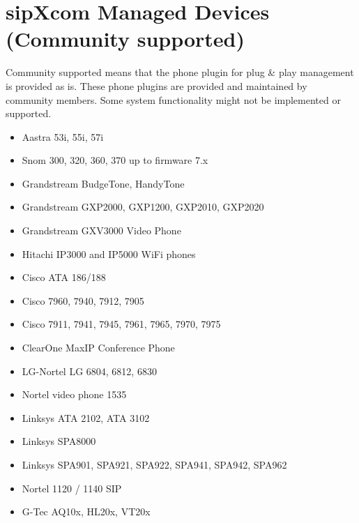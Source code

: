\documentclass[letterpaper,10pt,english]{sphinxmanual}
\begin{document}
\section{sipXcom Managed Devices (Community supported)}
\label{\detokenize{features:sipxcom-managed-devices-community-supported}}
Community supported means that the phone plugin for plug \& play management is provided as is. These phone plugins are provided and maintained by community members. Some system functionality might not be implemented or supported.
\begin{itemize}
\item {} 
Aastra 53i, 55i, 57i

\item {} 
Snom 300, 320, 360, 370 up to firmware 7.x

\item {} 
Grandstream BudgeTone, HandyTone

\item {} 
Grandstream GXP2000, GXP1200, GXP2010, GXP2020

\item {} 
Grandstream GXV3000 Video Phone

\item {} 
Hitachi IP3000 and IP5000 WiFi phones

\item {} 
Cisco ATA 186/188

\item {} 
Cisco 7960, 7940, 7912, 7905

\item {} 
Cisco 7911, 7941, 7945, 7961, 7965, 7970, 7975

\item {} 
ClearOne MaxIP Conference Phone

\item {} 
LG-Nortel LG 6804, 6812, 6830

\item {} 
Nortel video phone 1535

\item {} 
Linksys ATA 2102, ATA 3102

\item {} 
Linksys SPA8000

\item {} 
Linksys SPA901, SPA921, SPA922, SPA941, SPA942, SPA962

\item {} 
Nortel 1120 / 1140 SIP

\item {} 
G-Tec AQ10x, HL20x, VT20x

\end{itemize}
\end{document}
